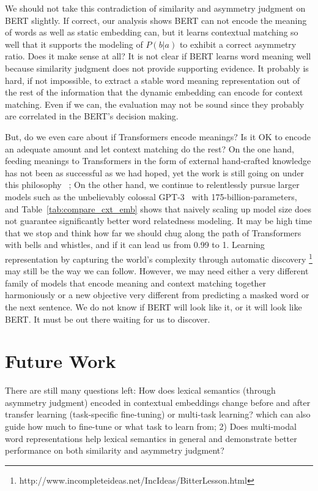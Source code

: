\documentclass[letterpaper]{article} %
\begin{document}
We should not take this contradiction of similarity and asymmetry judgment on BERT slightly. If correct, our analysis shows BERT can not encode the meaning of words as well as static embedding can, but it learns contextual matching so well that it supports the modeling of $P(b|a)$ to exhibit a correct asymmetry ratio. Does it make sense at all? It is not clear if BERT learns word meaning well because similarity judgment does not provide supporting evidence. It probably is hard, if not impossible, to extract a stable word meaning representation out of the rest of the information that the dynamic embedding can encode for context matching. Even if we can, the evaluation may not be sound since they probably are correlated in the BERT's decision making.

But, do we even care about if Transformers encode meanings? Is it OK to encode an adequate amount and let context matching do the rest? On the one hand, feeding meanings to Transformers in the form of external hand-crafted knowledge has not been as successful as we had hoped, yet the work is still going on under this philosophy ~\citep{liu2019k}; On the other hand, we continue to relentlessly pursue larger models such as the unbelievably colossal GPT-3~\cite{brown2020language} with 175-billion-parameters, and Table~\ref{tab:compare_cxt_emb} shows that naively scaling up model size does not guarantee significantly better word relatedness modeling. It may be high time that we stop and think how far we should chug along the path of Transformers with bells and whistles, and if it can lead us from 0.99 to 1. Learning representation by capturing the world's complexity through automatic discovery \footnote{http://www.incompleteideas.net/IncIdeas/BitterLesson.html} may still be the way we can follow. However, we may need either a very different family of models that encode meaning and context matching together harmoniously or a new objective very different from predicting a masked word or the next sentence. We do not know if BERT will look like it, or it will look like BERT. It must be out there waiting for us to discover.

\section{Future Work} There are still many questions left: How does lexical semantics (through asymmetry judgment) encoded in contextual embeddings change before and after transfer learning (task-specific fine-tuning) or multi-task learning? which can also guide how much to fine-tune or what task to learn from;
2) Does multi-modal word representations help lexical semantics in general and demonstrate better  performance on both similarity and asymmetry judgment?
\end{document}
